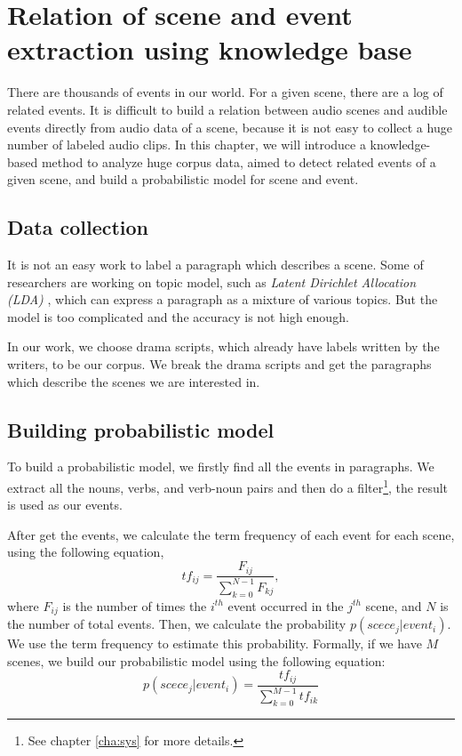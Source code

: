 \chapter{Relation of scene and event extraction using knowledge base}

There are thousands of events in our world. For a given scene, there are a log of related events. It is difficult to build a relation between audio scenes and audible events directly from audio data of a scene, because it is not easy to collect a huge number of labeled audio clips. In this chapter, we will introduce a knowledge-based method to analyze huge corpus data, aimed to detect related events of a given scene, and build a probabilistic model for scene and event.

\section{Data collection}
It is not an easy work to label a paragraph which describes a scene. Some of researchers are working on topic model, such as {\em Latent Dirichlet Allocation (LDA)} \cite{Blei:2003:LDA:944919.944937}, which can express a paragraph as a mixture of various topics. But the model is too complicated and the accuracy is not high enough.

In our work, we choose drama scripts, which already have labels written by the writers, to be our corpus. We break the drama scripts and get the paragraphs which describe the scenes we are interested in.
\section{Building probabilistic model}
To build a probabilistic model, we firstly find all the events in paragraphs. We extract all the nouns, verbs, and verb-noun pairs and then do a filter\footnote{See chapter \ref{cha:sys} for more details.}, the result is used as our events.

After get the events, we calculate the term frequency of each event for each scene, using the following equation,
\begin{equation}
tf_{ij}=\frac{F_{ij}}{\sum_{k=0}^{N-1}F_{kj}},
\label{eq:tf}
\end{equation}
where $F_{ij}$ is the number of times the $i^{th}$ event occurred in the $j^{th}$ scene, and $N$ is the number of total events. Then, we calculate the probability $p(scece_j|event_i)$. We use the term frequency to estimate this probability. Formally, if we have $M$ scenes, we build our probabilistic model using the following equation:
\begin{equation}
p(scece_j|event_i) = \frac{tf_{ij}}{\sum_{k=0}^{M-1}tf_{ik}}
\label{eq:model}
\end{equation}

